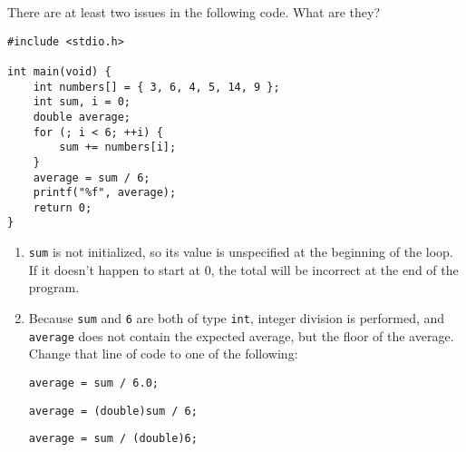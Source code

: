 There are at least two issues in the following code. What are they?

\begin{verbatim}
#include <stdio.h>

int main(void) {
    int numbers[] = { 3, 6, 4, 5, 14, 9 };
    int sum, i = 0;
    double average;
    for (; i < 6; ++i) {
        sum += numbers[i];
    }
    average = sum / 6;
    printf("%f", average);
    return 0;
}
\end{verbatim}

\begin{answer}
\begin{enumerate}
\item \texttt{sum} is not initialized, so its value is unspecified at the beginning of the loop. If it doesn't happen to start at 0, the total will be incorrect at the end of the program.
\item Because \texttt{sum} and \texttt{6} are both of type \texttt{int}, integer division is performed, and \texttt{average} does not contain the expected average, but the floor of the average. Change that line of code to one of the following:
\begin{verbatim}
average = sum / 6.0;
\end{verbatim}
\begin{verbatim}
average = (double)sum / 6;
\end{verbatim}
\begin{verbatim}
average = sum / (double)6;
\end{verbatim}
\end{enumerate}
\end{answer}
